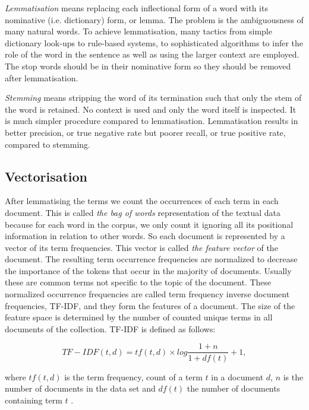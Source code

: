 \emph{Lemmatisation} means replacing each inflectional form of a 
word with its nominative (i.e. dictionary) form, or lemma. 
The problem is the ambiguousness of many natural words. To 
achieve lemmatisation, many tactics from simple dictionary look-ups to 
rule-based systems, to sophisticated algorithms to infer the role 
of the word in the sentence as well as using the larger context are
employed. The stop words should be in their nominative form so they 
should be removed after lemmatisation.

\emph{Stemming} means stripping the word of its termination such 
that only the stem of the word is retained. No context is used 
and only the word itself is inspected. It is much simpler procedure
compared to lemmatisation.
Lemmatisation results in better precision, or true negative rate 
but poorer recall, or true positive rate, compared to stemming. 
\cite{manning_introduction_2008}


\subsection{Vectorisation}
After lemmatising the terms we count the occurrences of each term 
in each document. This is called \emph{the bag of words} 
representation of the textual data because for each word in the 
corpus, we only count it ignoring all its positional information 
in relation to other words. So each document is represented by
a vector of its term frequencies. This vector is called \emph{the 
feature vector} of the document. 
The resulting term occurrence 
frequencies are normalized to decrease the importance of the 
tokens that occur in the majority of documents. Usually these are 
common terms not specific to the topic of the document. 
These normalized occurrence frequencies are called term 
frequency inverse document frequencies, TF-IDF, and 
they form the features of a document. The size of the feature 
space is determined by the number of counted unique terms in all 
documents of the collection. 
TF-IDF is defined as follows:

\begin{equation}
 TF-IDF(t,d) = tf(t,d) \times log \frac{1+n}{1+df(t)} + 1,
\end{equation}

where $tf(t,d)$ is the term frequency, count of a term $t$ in a 
document $d$, $n$ is the number of documents in the data set and 
$df(t)$ the number of documents containing term $t$ 
\cite{luhn_statistical_1957}\cite{jones_statistical_1972}.

